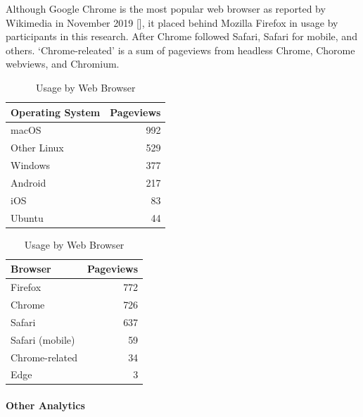 \documentclass{article}
\begin{document}
Although Google Chrome is the most popular web browser as reported by Wikimedia in November 2019 [], it placed behind Mozilla Firefox in usage by participants in this research. After Chrome followed Safari, Safari for mobile, and others. `Chrome-releated' is a sum of pageviews from headless Chrome, Chorome webviews, and Chromium.

\begin{table}[!htb]
	\begin{minipage}{.5\linewidth}
		\caption{Usage by Operating System}
		\centering
		\begin{tabular}{lr}
			\hline
			\textbf{Operating System} & \textbf{Pageviews} \\
			\hline
			macOS                     & 992                \\
			Other Linux               & 529                \\
			Windows                   & 377                \\
			Android                   & 217                \\
			iOS                       & 83                 \\
			Ubuntu                    & 44                 \\
			\hline
		\end{tabular}
	\end{minipage}%
	\hspace{.1cm}
	\begin{minipage}{.5\linewidth}
		\centering
		\caption{Usage by Web Browser}
		\begin{tabular}{lr}
			\hline
			\textbf{Browser}  & \textbf{Pageviews} \\
			\hline
			Firefox           & 772                \\
			Chrome            & 726                \\
			Safari            & 637                \\
			Safari (mobile)   & 59                 \\
			Chrome-related    & 34                 \\
			Edge              & 3                  \\
			\hline
		\end{tabular}
	\end{minipage} 
\end{table}

\paragraph{Other Analytics}
\end{document}

